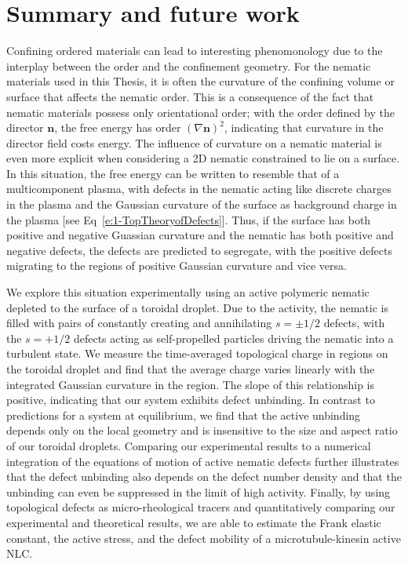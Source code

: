 \chapter{Summary and future work}
Confining ordered materials can lead to interesting phenomonology due to the interplay between the order and the confinement geometry.
For the nematic materials used in this Thesis, it is often the curvature of the confining volume or surface that affects the nematic order.
This is a consequence of the fact that nematic materials possess only orientational order; with the order defined by the director $\mathbf{n}$, the free energy has order $(\nabla \mathbf{n})^2$, indicating that curvature in the director field costs energy.
The influence of curvature on a nematic material is even more explicit when considering a 2D nematic constrained to lie on a surface.
In this situation, the free energy can be written to resemble that of a multicomponent plasma, with defects in the nematic acting like discrete charges in the plasma and the Gaussian curvature of the surface as background charge in the plasma  [see Eq~\ref{e:1-TopTheoryofDefects}].
Thus, if the surface has both positive and negative Guassian curvature and the nematic has both positive and negative defects, the defects are predicted to segregate, with the positive defects migrating to the regions of positive Gaussian curvature and vice versa.

We explore this situation experimentally using an active polymeric nematic depleted to the surface of a toroidal droplet.
Due to the activity, the nematic is filled with pairs of constantly creating and annihilating $s = \pm 1/2$ defects, with the $s = +1/2$ defects acting as self-propelled particles driving the nematic into a turbulent state.
We measure the time-averaged topological charge in regions on the toroidal droplet and find that the average charge varies linearly with the integrated Gaussian curvature in the region.
The slope of this relationship is positive, indicating that our system exhibits defect unbinding.
In contrast to predictions for a system at equilibrium, we find that the active unbinding depends only on the local geometry and is insensitive to the size and aspect ratio of our toroidal droplets.
Comparing our experimental results to a numerical integration of the equations of motion of active nematic defects further illustrates that the defect unbinding also depends on the defect number density and that the unbinding can even be suppressed in the limit of high activity.
Finally, by using topological defects as micro-rheological tracers and quantitatively comparing our experimental and theoretical results, we are able to estimate the Frank elastic constant, the active stress, and the defect mobility of a microtubule-kinesin active NLC.

